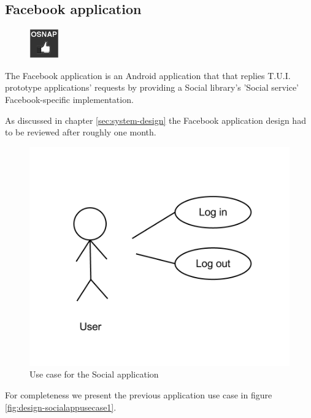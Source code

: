 \subsection{Facebook application} \label{section:service-fb}
\begin{figure}
	\centering \includegraphics[scale=1]{img/app-fb}
\end{figure}
The Facebook application is an Android application that that replies
T.U.I. prototype applications' requests by providing a Social library's 'Social service'
Facebook-specific implementation.

As discussed in chapter \ref{sec:system-design} the Facebook application design had to be reviewed after roughly one month.

\begin{figure}[H]
	\centering \includegraphics[scale=0.35]{img/design-socialappusecase2}
	\caption{Use case for the Social application}
	\label{fig:design-socialappusecase2}
\end{figure}

For completeness we present the previous application use case in figure \ref{fig:design-socialappusecase1}.

